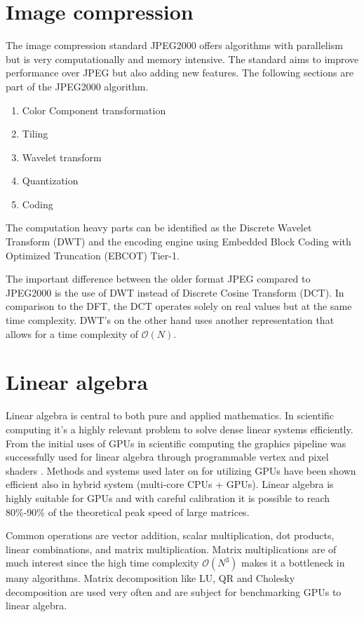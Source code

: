 \section{Image compression}
The image compression standard JPEG2000 offers algorithms with parallelism but is very computationally and memory intensive. The standard aims to improve performance over JPEG but also adding new features. The following sections are part of the JPEG2000 algorithm\cite{Christopoulos2000}.
\begin{enumerate}
	\item Color Component transformation
	\item Tiling
	\item Wavelet transform
	\item Quantization
	\item Coding
\end{enumerate}

The computation heavy parts can be identified as the Discrete Wavelet Transform (DWT) and the encoding engine using Embedded Block Coding with Optimized Truncation (EBCOT) Tier-1.

The important difference between the older format JPEG compared to JPEG2000 is the use of DWT instead of Discrete Cosine Transform (DCT). In comparison to the DFT, the DCT operates solely on real values but at the same time complexity. DWT's on the other hand uses another representation that allows for a time complexity of $\mathcal{O}(N)$.

\section{Linear algebra}
Linear algebra is central to both pure and applied mathematics. In scientific computing it's a highly relevant problem to solve dense linear systems efficiently. From the initial uses of GPUs in scientific computing the graphics pipeline was successfully used for linear algebra through programmable vertex and pixel shaders \cite{Kruger2003}. Methods and systems used later on for utilizing GPUs have been shown efficient also in hybrid system (multi-core CPUs + GPUs)\cite{Tomov2010}. Linear algebra is highly suitable for GPUs and with careful calibration it is possible to reach 80\%-90\% of the theoretical peak speed of large matrices\cite{Volkov2008}.

Common operations are vector addition, scalar multiplication, dot products, linear combinations, and matrix multiplication. Matrix multiplications are of much interest since the high time complexity $\mathcal{O}(N^3)$ makes it a bottleneck in many algorithms. Matrix decomposition like LU, QR and Cholesky decomposition are used very often and are subject for benchmarking GPUs to linear algebra\cite{Volkov2008}.


